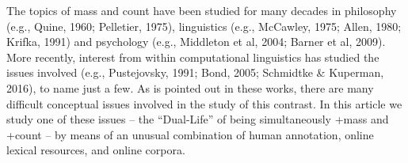 The topics of mass and count have been studied for many decades in philosophy (e.g., Quine, 1960; Pelletier, 1975), linguistics (e.g., McCawley, 1975; Allen, 1980; Krifka, 1991) and psychology (e.g., Middleton et al, 2004; Barner et al, 2009).                          More recently, interest from within computational linguistics has studied the issues involved (e.g., Pustejovsky, 1991; Bond, 2005; Schmidtke \& Kuperman, 2016), to name just a few.  As is pointed out in these works, there are many difficult conceptual issues involved in the study of this contrast. In this article we study one of these issues -- the ``Dual-Life'' of being simultaneously +mass and +count -- by means of an unusual combination of human annotation, online lexical resources, and online corpora.
